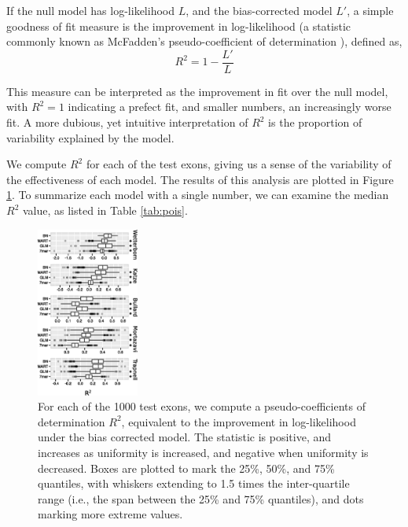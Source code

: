 \documentclass{bioinfo}
\begin{document}
If the null model has log-likelihood $L$, and the bias-corrected model $L'$, a
simple goodness of fit measure is the improvement in log-likelihood (a statistic
commonly known as McFadden's pseudo-coefficient of determination
\citep{McFadden1974}), defined as,
$$R^2 = 1 - \frac{L'}{L}$$

This measure can be interpreted as the improvement in fit over the null model,
with $R^2 = 1$ indicating a prefect fit, and smaller numbers, an increasingly
worse fit. A more dubious, yet intuitive interpretation of $R^2$ is the
proportion of variability explained by the model.

We compute $R^2$ for each of the test exons, giving us a sense of the variability
of the effectiveness of each model. The results of this analysis are plotted in
Figure \ref{fig:pois}.  To summarize each model with a single number, we can
examine the median $R^2$ value, as listed in Table \ref{tab:pois}.

\begin{figure}
\centerline{\includegraphics[width=0.30\textwidth]{pois-boxplot.eps}}
\caption{For each of the 1000 test exons, we compute a pseudo-coefficients of
determination $R^2$, equivalent to the improvement in log-likelihood under the
bias corrected model. The statistic is positive, and increases as uniformity is
increased, and negative when uniformity is decreased. Boxes are plotted to mark
the 25\%, 50\%, and 75\% quantiles, with whiskers extending to 1.5 times the
inter-quartile range (i.e., the span between the 25\% and 75\% quantiles), and
dots marking more extreme values.
}


    \label{fig:pois}
\end{figure}
\end{document}
